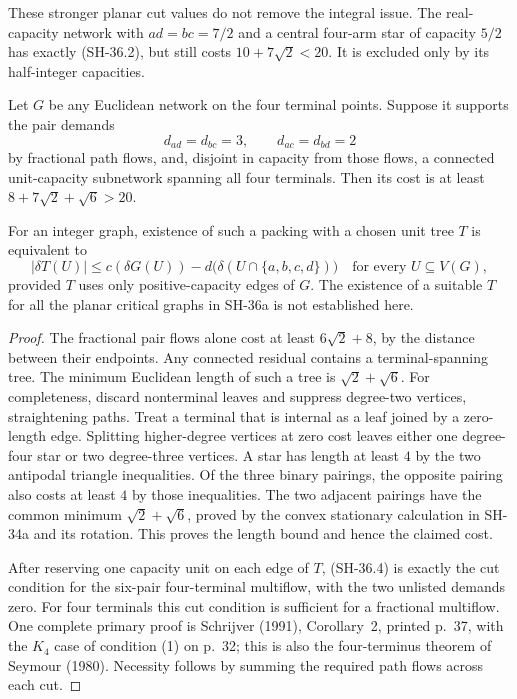 These stronger planar cut values do not remove the integral
issue.  The real-capacity network with $ad=bc=7/2$ and a
central four-arm star of capacity $5/2$ has exactly
(SH-36.2), but still costs $10+7\sqrt2<20$.
It is excluded only by its half-integer capacities.

\begin{lemma}
\label{lem:fractional-residual-gate}
Let $G$ be any Euclidean network on the four terminal points.
Suppose it supports the pair demands
\[
 d_{ad}=d_{bc}=3,\qquad d_{ac}=d_{bd}=2
                                                        \tag{SH-36.3}
\]
by fractional path flows, and, disjoint in capacity from
those flows, a connected unit-capacity subnetwork spanning
all four terminals.  Then its cost is at least
$8+7\sqrt2+\sqrt6>20$.

For an integer graph, existence of such a packing with a
chosen unit tree $T$ is equivalent to
\[
 |\delta T(U)|\le c(\delta G(U))
        -d\bigl(\delta(U\cap\{a,b,c,d\})\bigr)
 \quad\text{for every }U\subseteq V(G),                 \tag{SH-36.4}
\]
provided $T$ uses only positive-capacity edges of $G$.
The existence of a suitable $T$ for all the planar critical
graphs in SH-36a is not established here.
\end{lemma}

\begin{proof}
The fractional pair flows alone cost at least
$6\sqrt2+8$, by the distance between their endpoints.
Any connected residual contains a terminal-spanning tree.
The minimum Euclidean length of such a tree is
$\sqrt2+\sqrt6$.  For completeness, discard nonterminal
leaves and suppress degree-two vertices, straightening
paths.  Treat a terminal that is internal as a leaf joined
by a zero-length edge.  Splitting higher-degree vertices
at zero cost leaves either one degree-four star or two
degree-three vertices.  A star has length at least $4$
by the two antipodal triangle inequalities.  Of the three
binary pairings, the opposite pairing also costs at least
$4$ by those inequalities.  The two adjacent pairings
have the common minimum $\sqrt2+\sqrt6$, proved by the
convex stationary calculation in SH-34a and its rotation.
This proves the length bound and hence the claimed cost.

After reserving one capacity unit on each edge of $T$,
(SH-36.4) is exactly the cut condition for the six-pair
four-terminal multiflow, with the two unlisted demands
zero.  For four terminals this cut condition is sufficient
for a fractional multiflow.  One complete primary proof
is Schrijver (1991), Corollary~2, printed p.~37, with the
$K_4$ case of condition (1) on p.~32; this is also the
four-terminus theorem of Seymour (1980).  Necessity follows
by summing the required path flows across each cut.
\end{proof}

